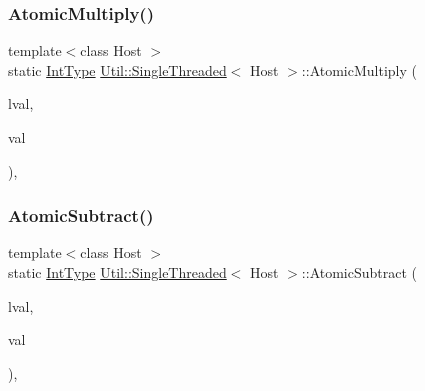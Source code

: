 \mbox{\label{classUtil_1_1SingleThreaded_a9cd0831ac28b49d1fa7bd8d24bf282bd}} 
\subsubsection{\texorpdfstring{AtomicMultiply()}{AtomicMultiply()}\hspace{0.1cm}{\footnotesize\ttfamily [3/3]}}
{\footnotesize\ttfamily template$<$class Host $>$ \\
static \mbox{\hyperlink{classUtil_1_1SingleThreaded_a35932213fb0c15a7b67ced79bc2af4c6}{Int\+Type}} \mbox{\hyperlink{classUtil_1_1SingleThreaded}{Util\+::\+Single\+Threaded}}$<$ Host $>$\+::Atomic\+Multiply (\begin{DoxyParamCaption}\item[{volatile \mbox{\hyperlink{classUtil_1_1SingleThreaded_a35932213fb0c15a7b67ced79bc2af4c6}{Int\+Type}} \&}]{lval,  }\item[{\mbox{\hyperlink{classUtil_1_1SingleThreaded_a35932213fb0c15a7b67ced79bc2af4c6}{Int\+Type}}}]{val }\end{DoxyParamCaption})\hspace{0.3cm}{\ttfamily [inline]}, {\ttfamily [static]}}

\mbox{\label{classUtil_1_1SingleThreaded_a69e02798b76b46c5df8ed4cfe37ac9c5}} 
\subsubsection{\texorpdfstring{AtomicSubtract()}{AtomicSubtract()}\hspace{0.1cm}{\footnotesize\ttfamily [1/3]}}
{\footnotesize\ttfamily template$<$class Host $>$ \\
static \mbox{\hyperlink{classUtil_1_1SingleThreaded_a35932213fb0c15a7b67ced79bc2af4c6}{Int\+Type}} \mbox{\hyperlink{classUtil_1_1SingleThreaded}{Util\+::\+Single\+Threaded}}$<$ Host $>$\+::Atomic\+Subtract (\begin{DoxyParamCaption}\item[{volatile \mbox{\hyperlink{classUtil_1_1SingleThreaded_a35932213fb0c15a7b67ced79bc2af4c6}{Int\+Type}} \&}]{lval,  }\item[{\mbox{\hyperlink{classUtil_1_1SingleThreaded_a35932213fb0c15a7b67ced79bc2af4c6}{Int\+Type}}}]{val }\end{DoxyParamCaption})\hspace{0.3cm}{\ttfamily [inline]}, {\ttfamily [static]}}

